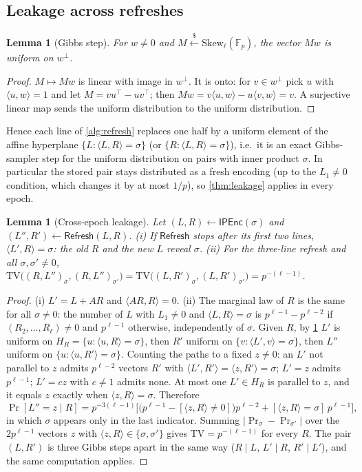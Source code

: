\documentclass[10.5pt,a4paper]{article}
\theoremstyle{plain}
\newtheorem{lemma}[theorem]{Lemma}
\theoremstyle{definition}
\newcommand{\Fp}{\mathbb{F}_p}
\newcommand{\ip}[2]{\langle #1,#2\rangle}
\newcommand{\TV}{\mathrm{TV}}
\newcommand{\Skew}{\mathrm{Skew}_\ell(\Fp)}
\newcommand{\Enc}{\mathsf{IPEnc}}
\newcommand{\getsr}{\xleftarrow{\$}}
\begin{document}
\subsection{Leakage across refreshes}

\begin{lemma}[Gibbs step]\label{lem:gibbs}
For $w\neq0$ and $M\getsr\Skew$, the vector $Mw$ is uniform on $w^\perp$.
\end{lemma}
\begin{proof}
$M\mapsto Mw$ is linear with image in $w^\perp$. It is onto: for $v\in w^\perp$ pick $u$ with $\ip uw=1$ and let $M=vu^\top-uv^\top$; then $Mw=v\ip uw-u\ip vw=v$. A surjective linear map sends the uniform distribution to the uniform distribution.
\end{proof}

Hence each line of \cref{alg:refresh} replaces one half by a uniform element of the affine hyperplane $\{L:\ip LR=\sigma\}$ (or $\{R:\ip LR=\sigma\}$), i.e.\ it is an exact Gibbs-sampler step for the uniform distribution on pairs with inner product $\sigma$. In particular the stored pair stays distributed as a fresh encoding (up to the $L_1\neq0$ condition, which changes it by at most $1/p$), so \cref{thm:leakage} applies in every epoch.

\begin{lemma}[Cross-epoch leakage]\label{lem:refresh}
Let $(L,R)\gets\Enc(\sigma)$ and $(L'',R')\gets\mathsf{Refresh}(L,R)$.
(i) If $\mathsf{Refresh}$ stops after its first two lines, $\ip{L'}{R}=\sigma$: the old $R$ and the new $L$ reveal $\sigma$.
(ii) For the three-line refresh and all $\sigma,\sigma'\neq0$, $\TV\big((R,L'')_\sigma,(R,L'')_{\sigma'}\big)=\TV\big((L,R')_\sigma,(L,R')_{\sigma'}\big)=p^{-(\ell-1)}$.
\end{lemma}
\begin{proof}
(i) $L'=L+AR$ and $\ip{AR}{R}=0$. (ii) The marginal law of $R$ is the same for all $\sigma\neq0$: the number of $L$ with $L_1\neq0$ and $\ip LR=\sigma$ is $p^{\ell-1}-p^{\ell-2}$ if $(R_2,\dots,R_\ell)\neq0$ and $p^{\ell-1}$ otherwise, independently of $\sigma$. Given $R$, by \cref{lem:gibbs} $L'$ is uniform on $H_R=\{u:\ip uR=\sigma\}$, then $R'$ uniform on $\{v:\ip{L'}v=\sigma\}$, then $L''$ uniform on $\{u:\ip u{R'}=\sigma\}$. Counting the paths to a fixed $z\neq0$: an $L'$ not parallel to $z$ admits $p^{\ell-2}$ vectors $R'$ with $\ip{L'}{R'}=\ip z{R'}=\sigma$; $L'=z$ admits $p^{\ell-1}$; $L'=cz$ with $c\neq1$ admits none. At most one $L'\in H_R$ is parallel to $z$, and it equals $z$ exactly when $\ip zR=\sigma$. Therefore
\[
\Pr[L''=z\mid R]=p^{-3(\ell-1)}\Big[\big(p^{\ell-1}-[\ip zR\neq0]\big)p^{\ell-2}+[\ip zR=\sigma]\,p^{\ell-1}\Big],
\]
in which $\sigma$ appears only in the last indicator. Summing $|\Pr_\sigma-\Pr_{\sigma'}|$ over the $2p^{\ell-1}$ vectors $z$ with $\ip zR\in\{\sigma,\sigma'\}$ gives $\TV=p^{-(\ell-1)}$ for every $R$. The pair $(L,R')$ is three Gibbs steps apart in the same way ($R\mid L$, $L'\mid R$, $R'\mid L'$), and the same computation applies.
\end{proof}
\end{document}
